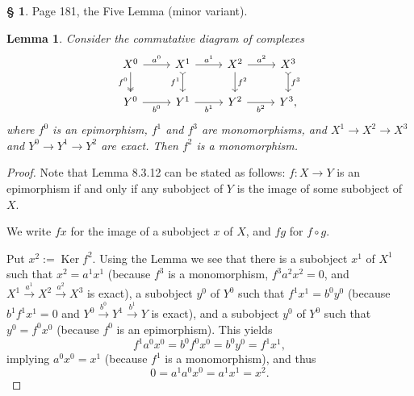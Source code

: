 \documentclass[12pt]{article}%
\newtheorem{lem}[thm]{Lemma}
\theoremstyle{remark}
\theoremstyle{definition}
\newtheorem{s}[thm]{\S}%
\DeclareMathOperator{\Ker}{Ker}
\begin{document}
\begin{s} 
Page 181, the Five Lemma (minor variant). 
%
\begin{lem} 
Consider the commutative diagram of complexes 
$$
\begin{tikzcd}
X^0\arrow[two heads]{d}[swap]{f^0}\arrow{r}{a^0}&
X^1\arrow[tail]{d}[swap]{f^1}\arrow{r}{a^1}&
X^2\arrow{d}{f^2}\arrow{r}{a^2}&
X^3\arrow[tail]{d}{f^3}\\ 
Y^0\arrow{r}[swap]{b^0}&
Y^1\arrow{r}[swap]{b^1}&
Y^2\arrow{r}[swap]{b^2}&
Y^3,
\end{tikzcd}
$$
where $f^0$ is an epimorphism, $f^1$ and $f^3$ are monomorphisms, and $X^1\to X^2\to X^3$ and $Y^0\to Y^1\to Y^2$ are exact. Then $f^2$ is a monomorphism. 
\end{lem} 
%
\begin{proof}
Note that Lemma 8.3.12 can be stated as follows: $f:X\to Y$ is an epimorphism if and only if any subobject of $Y$ is the image of some subobject of $X$. 

We write $fx$ for the image of a subobject $x$ of $X$, and $fg$ for $f\circ g$.

Put $x^2:=\Ker f^2$. Using the Lemma we see that there is a subobject $x^1$ of $X^1$ such that $x^2=a^1x^1$ (because $f^3$ is a monomorphism, $f^3a^2x^2=0$, and $X^1\overset{a^1}{\to}X^2\overset{a^2}{\to}X^3$ is exact), a subobject $y^0$ of $Y^0$ such that $f^1x^1=b^0y^0$ (because $b^1f^1x^1=0$ and $Y^0\overset{b^0}{\to}Y^1\overset{b^1}{\to}Y$ is exact), and a subobject $y^0$ of $Y^0$ such that $y^0=f^0x^0$ (because $f^0$ is an epimorphism). This yields 
$$
f^1a^0x^0=b^0f^0x^0=b^0y^0=f^1x^1,
$$
implying $a^0x^0=x^1$ (because $f^1$ is a monomorphism), and thus 
$$
0=a^1a^0x^0=a^1x^1=x^2.
$$
\end{proof}
\end{s}

%
\end{document}
